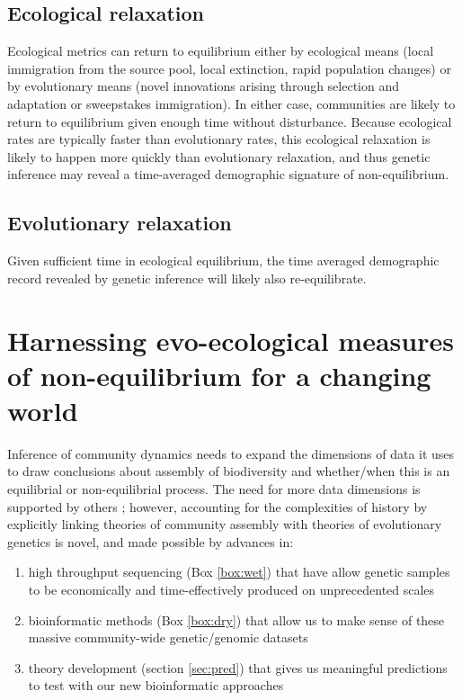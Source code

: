 \documentclass[12pt]{article}
\newcounter{Box}
\begin{document}
\subsection{Ecological relaxation}

Ecological metrics can return to equilibrium either by ecological
means (local immigration from the source pool, local extinction, rapid
population changes) or by evolutionary means (novel innovations
arising through selection and adaptation or sweepstakes
immigration). In either case, communities are likely to return to
equilibrium given enough time without disturbance. Because ecological
rates are typically faster than evolutionary rates, this ecological
relaxation is likely to happen more quickly than evolutionary
relaxation, and thus genetic inference may reveal a time-averaged
demographic signature of non-equilibrium.

\subsection{Evolutionary relaxation}

Given sufficient time in ecological equilibrium, the time averaged
demographic record revealed by genetic inference will likely also
re-equilibrate.


\section{Harnessing evo-ecological measures of non-equilibrium for a changing world}

Inference of community dynamics needs to expand the dimensions of data
it uses to draw conclusions about assembly of biodiversity and
whether/when this is an equilibrial or non-equilibrial process. The
need for more data dimensions is supported by others
\citep{McGill2007-hx}; however, accounting for the complexities of
history by explicitly linking theories of community assembly with
theories of evolutionary genetics is novel, and made possible by
advances in:
\begin{enumerate}
\item high throughput sequencing (Box \ref{box:wet}) that have allow
  genetic samples to be economically and time-effectively produced on
  unprecedented scales
\item bioinformatic methods (Box \ref{box:dry}) that allow
  us to make sense of these massive community-wide genetic/genomic
  datasets
\item theory development (section \ref{sec:pred}) that gives us
  meaningful predictions to test with our new bioinformatic approaches
\end{enumerate}
\end{document}
